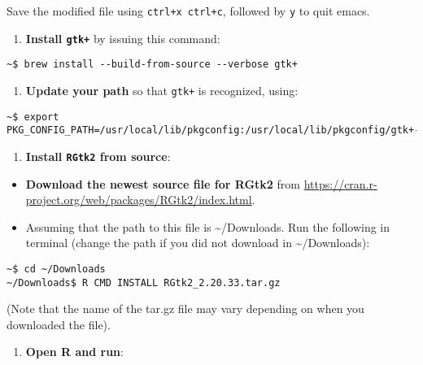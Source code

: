 \documentclass[]{article}
\providecommand{\tightlist}{%
  \setlength{\itemsep}{0pt}\setlength{\parskip}{0pt}}
\begin{document}
Save the modified file using \texttt{ctrl+x\ ctrl+c}, followed by
\texttt{y} to quit emacs.

\begin{enumerate}
\def\labelenumi{\arabic{enumi}.}
\setcounter{enumi}{2}
\tightlist
\item
  \textbf{Install \texttt{gtk+}} by issuing this command:
\end{enumerate}

\begin{verbatim}
~$ brew install --build-from-source --verbose gtk+
\end{verbatim}

\begin{enumerate}
\def\labelenumi{\arabic{enumi}.}
\setcounter{enumi}{3}
\tightlist
\item
  \textbf{Update your path} so that \texttt{gtk+} is recognized, using:
\end{enumerate}

\begin{verbatim}
~$ export PKG_CONFIG_PATH=/usr/local/lib/pkgconfig:/usr/local/lib/pkgconfig/gtk+-2.0.pc:/opt/X11/lib/pkgconfig
\end{verbatim}

\begin{enumerate}
\def\labelenumi{\arabic{enumi}.}
\setcounter{enumi}{4}
\tightlist
\item
  \textbf{Install \texttt{RGtk2} from source}:
\end{enumerate}

\begin{itemize}
\item
  \textbf{Download the newest source file for RGtk2} from
  \url{https://cran.r-project.org/web/packages/RGtk2/index.html}.
\item
  Assuming that the path to this file is \textasciitilde{}/Downloads.
  Run the following in terminal (change the path if you did not download
  in \textasciitilde{}/Downloads):
\end{itemize}

\begin{verbatim}
~$ cd ~/Downloads
~/Downloads$ R CMD INSTALL RGtk2_2.20.33.tar.gz
\end{verbatim}

(Note that the name of the tar.gz file may vary depending on when you
downloaded the file).

\begin{enumerate}
\def\labelenumi{\arabic{enumi}.}
\setcounter{enumi}{5}
\tightlist
\item
  \textbf{Open R and run}:
\end{enumerate}
\end{document}
